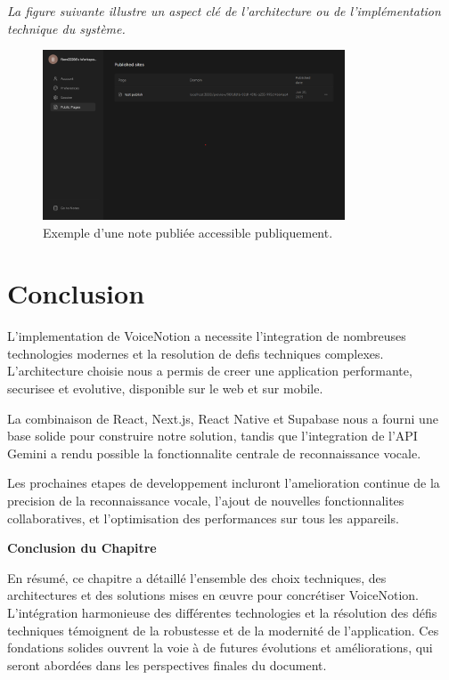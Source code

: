 \noindent
\textit{La figure suivante illustre un aspect clé de l'architecture ou de l'implémentation technique du système.}
\begin{figure}[H]
    \centering
    \includegraphics[width=0.8\textwidth]{assets/docs/web/dashboard-public-page-dark.png}
    \caption{Exemple d'une note publiée accessible publiquement.}
    \label{fig:web-public-note}
\end{figure}

\section{Conclusion}
L'implementation de VoiceNotion a necessite l'integration de nombreuses technologies modernes et la resolution de defis techniques complexes. L'architecture choisie nous a permis de creer une application performante, securisee et evolutive, disponible sur le web et sur mobile.

La combinaison de React, Next.js, React Native et Supabase nous a fourni une base solide pour construire notre solution, tandis que l'integration de l'API Gemini a rendu possible la fonctionnalite centrale de reconnaissance vocale.

Les prochaines etapes de developpement incluront l'amelioration continue de la precision de la reconnaissance vocale, l'ajout de nouvelles fonctionnalites collaboratives, et l'optimisation des performances sur tous les appareils. 

\vspace{1cm}
\begin{center}
\textbf{\large Conclusion du Chapitre}
\end{center}

\noindent
En résumé, ce chapitre a détaillé l'ensemble des choix techniques, des architectures et des solutions mises en œuvre pour concrétiser VoiceNotion. L'intégration harmonieuse des différentes technologies et la résolution des défis techniques témoignent de la robustesse et de la modernité de l'application. Ces fondations solides ouvrent la voie à de futures évolutions et améliorations, qui seront abordées dans les perspectives finales du document.
